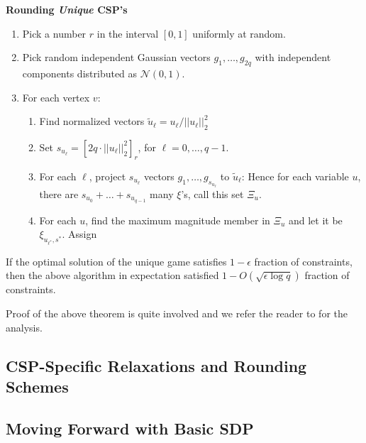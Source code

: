 \begin{algorithm}\textbf{Rounding \textit{Unique} CSP's}
\begin{enumerate}
\item Pick a number $r$ in the interval $[0, 1]$ uniformly at random.
\item Pick random independent Gaussian vectors $g_1, \ldots, g_{2q}$ with independent components distributed as $\mathcal{N}(0, 1)$.
\item For each vertex $v$:
\begin{enumerate}
\item Find normalized vectors $\tilde{u}_{\ell} = {u_{\ell}}/{||u_\ell||_2^2}$
\item Set $s_{u_\ell} = [2q \cdot ||u_\ell||_2^2]_r$, for $\ell=0, \ldots, q-1$.
\item For each $\ell$, project $s_{u_\ell}$ vectors $g_1, \ldots, g_{s_{u_\ell}}$ to $\tilde{u}_\ell$:
Hence for each variable $u$, there are $s_{u_0}+\ldots+s_{u_{q-1}}$ many $\xi$'s, call this set $\Xi_u$.
\item For each $u$, find the maximum magnitude member in $\Xi_u$ and let it be $\xi_{u_{\ell^*}, s^*}$. Assign
\end{enumerate}
\end{enumerate}
\end{algorithm}
\begin{theorem}
If the optimal solution of the unique game satisfies $1-\epsilon$ fraction of constraints, then the above algorithm in expectation satisfied $1-O({\sqrt{\epsilon \log q }})$ fraction of constraints.
\end{theorem}
Proof of the above theorem is quite involved and we refer the reader to \cite{cmm06} for the analysis.

\subsection{CSP-Specific Relaxations and Rounding Schemes}

\subsection{Moving Forward with Basic SDP}
